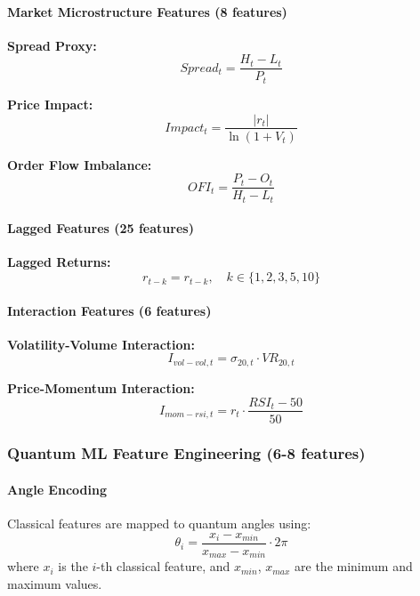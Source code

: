 \documentclass[12pt,a4paper]{article}
\begin{document}
\paragraph{Market Microstructure Features (8 features)}

\textbf{Spread Proxy:}
\begin{equation}
Spread_t = \frac{H_t - L_t}{P_t}
\end{equation}

\textbf{Price Impact:}
\begin{equation}
Impact_t = \frac{|r_t|}{\ln(1 + V_t)}
\end{equation}

\textbf{Order Flow Imbalance:}
\begin{equation}
OFI_t = \frac{P_t - O_t}{H_t - L_t}
\end{equation}

\paragraph{Lagged Features (25 features)}

\textbf{Lagged Returns:}
\begin{equation}
r_{t-k} = r_{t-k}, \quad k \in \{1,2,3,5,10\}
\end{equation}

\paragraph{Interaction Features (6 features)}

\textbf{Volatility-Volume Interaction:}
\begin{equation}
I_{vol-vol,t} = \sigma_{20,t} \cdot VR_{20,t}
\end{equation}

\textbf{Price-Momentum Interaction:}
\begin{equation}
I_{mom-rsi,t} = r_t \cdot \frac{RSI_t - 50}{50}
\end{equation}

\subsubsection{Quantum ML Feature Engineering (6-8 features)}

\paragraph{Angle Encoding}
Classical features are mapped to quantum angles using:
\begin{equation}
\theta_i = \frac{x_i - x_{min}}{x_{max} - x_{min}} \cdot 2\pi
\end{equation}
where $x_i$ is the $i$-th classical feature, and $x_{min}$, $x_{max}$ are the minimum and maximum values.
\end{document}

